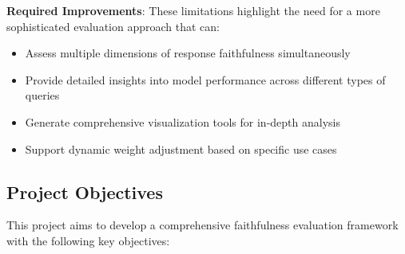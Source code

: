 \vspace{0.5em}
\textbf{Required Improvements}: These limitations highlight the need for a more sophisticated evaluation approach that can:
\begin{itemize}
    \item Assess multiple dimensions of response faithfulness simultaneously
    \item Provide detailed insights into model performance across different types of queries
    \item Generate comprehensive visualization tools for in-depth analysis
    \item Support dynamic weight adjustment based on specific use cases
\end{itemize}

\subsection{Project Objectives}
This project aims to develop a comprehensive faithfulness evaluation framework with the following key objectives:

